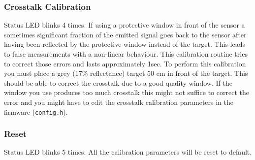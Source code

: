 \begin{multicols}{2}
\subsubsection{Crosstalk Calibration}
Status LED blinks 4 times.
If using a protective window in front of the sensor a sometimes significant fraction of the emitted signal goes back to the sensor after having been reflected by the protective window instead of the target. This leads to false measurements with a non-linear behaviour.
This calibration routine tries to correct those errors and lasts approximately 1sec. To perform this calibration you must place a grey (17\% reflectance) target 50 cm in front of the target. This should be able to correct the crosstalk due to a good quality window. If the window you use produces too much crosstalk this might not suffice to correct the error and you might have to edit the crosstalk calibration parameters in the firmware (\texttt{config.h}).

\subsubsection{Reset}
Status LED blinks 5 times.
All the calibration parameters will be reset to default.
\end{multicols}
\begingroup

